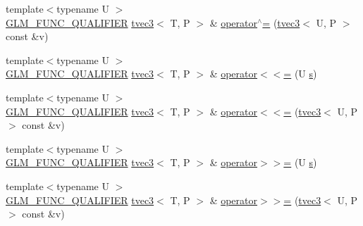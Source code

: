 \begin{DoxyCompactItemize}
\item 
{\footnotesize template$<$typename U $>$ }\\\hyperlink{setup_8hpp_a33fdea6f91c5f834105f7415e2a64407}{G\+L\+M\+\_\+\+F\+U\+N\+C\+\_\+\+Q\+U\+A\+L\+I\+F\+I\+ER} \hyperlink{structglm_1_1detail_1_1tvec3}{tvec3}$<$ T, P $>$ \& \hyperlink{structglm_1_1detail_1_1tvec3_afda445ba27ed5ca10a39b94b8e764fcb}{operator$^\wedge$=} (\hyperlink{structglm_1_1detail_1_1tvec3}{tvec3}$<$ U, P $>$ const \&v)
\item 
{\footnotesize template$<$typename U $>$ }\\\hyperlink{setup_8hpp_a33fdea6f91c5f834105f7415e2a64407}{G\+L\+M\+\_\+\+F\+U\+N\+C\+\_\+\+Q\+U\+A\+L\+I\+F\+I\+ER} \hyperlink{structglm_1_1detail_1_1tvec3}{tvec3}$<$ T, P $>$ \& \hyperlink{structglm_1_1detail_1_1tvec3_adf6a5496bcd1b0ece06a76b27117a134}{operator$<$$<$=} (U \hyperlink{structglm_1_1detail_1_1tvec3_aa7906d8cd1a54c96ba22c1f97ebaf7cc}{s})
\item 
{\footnotesize template$<$typename U $>$ }\\\hyperlink{setup_8hpp_a33fdea6f91c5f834105f7415e2a64407}{G\+L\+M\+\_\+\+F\+U\+N\+C\+\_\+\+Q\+U\+A\+L\+I\+F\+I\+ER} \hyperlink{structglm_1_1detail_1_1tvec3}{tvec3}$<$ T, P $>$ \& \hyperlink{structglm_1_1detail_1_1tvec3_aabbf88378ef21973abac8cdacd0b4117}{operator$<$$<$=} (\hyperlink{structglm_1_1detail_1_1tvec3}{tvec3}$<$ U, P $>$ const \&v)
\item 
{\footnotesize template$<$typename U $>$ }\\\hyperlink{setup_8hpp_a33fdea6f91c5f834105f7415e2a64407}{G\+L\+M\+\_\+\+F\+U\+N\+C\+\_\+\+Q\+U\+A\+L\+I\+F\+I\+ER} \hyperlink{structglm_1_1detail_1_1tvec3}{tvec3}$<$ T, P $>$ \& \hyperlink{structglm_1_1detail_1_1tvec3_ac6bc89e208ccf9b351c327559c9a630c}{operator$>$$>$=} (U \hyperlink{structglm_1_1detail_1_1tvec3_aa7906d8cd1a54c96ba22c1f97ebaf7cc}{s})
\item 
{\footnotesize template$<$typename U $>$ }\\\hyperlink{setup_8hpp_a33fdea6f91c5f834105f7415e2a64407}{G\+L\+M\+\_\+\+F\+U\+N\+C\+\_\+\+Q\+U\+A\+L\+I\+F\+I\+ER} \hyperlink{structglm_1_1detail_1_1tvec3}{tvec3}$<$ T, P $>$ \& \hyperlink{structglm_1_1detail_1_1tvec3_a20f86c2c8feefe660c7968878b794ac4}{operator$>$$>$=} (\hyperlink{structglm_1_1detail_1_1tvec3}{tvec3}$<$ U, P $>$ const \&v)
\end{DoxyCompactItemize}

